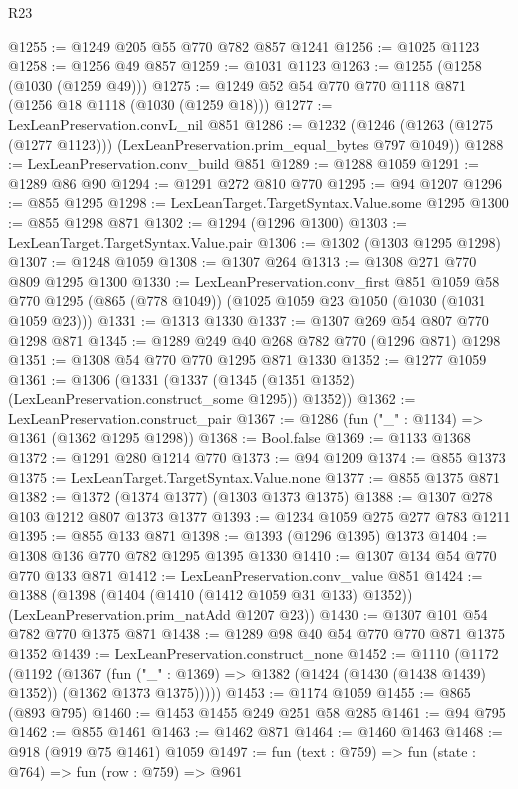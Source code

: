 \begin{lexlean}{R23}
\begin{coremodule}
@1255 := @1249 @205 @55 @770 @782 @857 @1241
@1256 := @1025 @1123
@1258 := @1256 @49 @857
@1259 := @1031 @1123
@1263 := @1255 (@1258 (@1030 (@1259 @49)))
@1275 := @1249 @52 @54 @770 @770 @1118 @871 (@1256 @18 @1118 (@1030 (@1259 @18)))
@1277 := LexLeanPreservation.convL_nil @851
@1286 := @1232
    (@1246 (@1263 (@1275 (@1277 @1123))) (LexLeanPreservation.prim_equal_bytes @797 @1049))
@1288 := LexLeanPreservation.conv_build @851
@1289 := @1288 @1059
@1291 := @1289 @86 @90
@1294 := @1291 @272 @810 @770
@1295 := @94 @1207
@1296 := @855 @1295
@1298 := LexLeanTarget.TargetSyntax.Value.some @1295
@1300 := @855 @1298 @871
@1302 := @1294 (@1296 @1300)
@1303 := LexLeanTarget.TargetSyntax.Value.pair
@1306 := @1302 (@1303 @1295 @1298)
@1307 := @1248 @1059
@1308 := @1307 @264
@1313 := @1308 @271 @770 @809 @1295 @1300
@1330 := LexLeanPreservation.conv_first
    @851
    @1059
    @58
    @770
    @1295
    (@865 (@778 @1049))
    (@1025 @1059 @23 @1050 (@1030 (@1031 @1059 @23)))
@1331 := @1313 @1330
@1337 := @1307 @269 @54 @807 @770 @1298 @871
@1345 := @1289 @249 @40 @268 @782 @770 (@1296 @871) @1298
@1351 := @1308 @54 @770 @770 @1295 @871 @1330
@1352 := @1277 @1059
@1361 := @1306
    (@1331 (@1337 (@1345 (@1351 @1352) (LexLeanPreservation.construct_some @1295)) @1352))
@1362 := LexLeanPreservation.construct_pair
@1367 := @1286 (fun ("_" : @1134) => @1361 (@1362 @1295 @1298))
@1368 := Bool.false
@1369 := @1133 @1368
@1372 := @1291 @280 @1214 @770
@1373 := @94 @1209
@1374 := @855 @1373
@1375 := LexLeanTarget.TargetSyntax.Value.none
@1377 := @855 @1375 @871
@1382 := @1372 (@1374 @1377) (@1303 @1373 @1375)
@1388 := @1307 @278 @103 @1212 @807 @1373 @1377
@1393 := @1234 @1059 @275 @277 @783 @1211
@1395 := @855 @133 @871
@1398 := @1393 (@1296 @1395) @1373
@1404 := @1308 @136 @770 @782 @1295 @1395 @1330
@1410 := @1307 @134 @54 @770 @770 @133 @871
@1412 := LexLeanPreservation.conv_value @851
@1424 := @1388
    (@1398 (@1404 (@1410 (@1412 @1059 @31 @133) @1352)) (LexLeanPreservation.prim_natAdd @1207 @23))
@1430 := @1307 @101 @54 @782 @770 @1375 @871
@1438 := @1289 @98 @40 @54 @770 @770 @871 @1375 @1352
@1439 := LexLeanPreservation.construct_none
@1452 := @1110
    (@1172
      (@1192
        (@1367
          (fun ("_" : @1369) => @1382 (@1424 (@1430 (@1438 @1439) @1352)) (@1362 @1373 @1375)))))
@1453 := @1174 @1059
@1455 := @865 (@893 @795)
@1460 := @1453 @1455 @249 @251 @58 @285
@1461 := @94 @795
@1462 := @855 @1461
@1463 := @1462 @871
@1464 := @1460 @1463
@1468 := @918 (@919 @75 @1461) @1059
@1497 := fun (text : @759) =>
  fun (state : @764) =>
  fun (row : @759) =>
  @961

\end{coremodule}
\end{lexlean}

